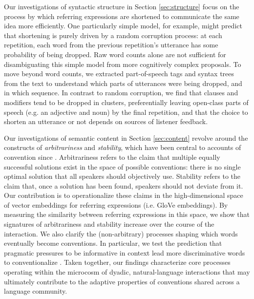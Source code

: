 \documentclass[alpha-refs]{wiley-article}
\newcommand{\ndg}[1]{\textcolor{green}{[ndg: #1]}}
\begin{document}
Our investigations of syntactic structure in Section \ref{sec:structure} focus on the process by which referring expressions are shortened to communicate the same idea more efficiently.
One particularly simple model, for example, might predict that shortening is purely driven by a random corruption process: at each repetition, each word from the previous repetition's utterance has some probability of being dropped.
Raw word counts alone are not sufficient for disambiguating this simple model from more cognitively complex proposals.
To move beyond word counts, we extracted part-of-speech tags and syntax trees from the text to understand which parts of utterances were being dropped, and in which sequence.
In contrast to random corruption, we find that clauses and modifiers tend to be dropped in clusters, preferentially leaving open-class parts of speech (e.g. an adjective and noun) by the final repetition, and that the choice to shorten an utterance or not depends on sources of listener feedback.  %

Our investigations of semantic content in Section \ref{sec:content} revolve around the constructs of \emph{arbitrariness} and \emph{stability}, which have been central to accounts of convention since \cite{Lewis69_Convention}.
Arbitrariness refers to the claim that multiple equally successful solutions exist in the space of possible conventions: there is no single optimal solution that all speakers should objectively use.
Stability refers to the claim that, once a solution has been found, speakers should not deviate from it.
Our contribution is to operationalize these claims in the high-dimensional space of vector embeddings for referring expressions (i.e. GloVe embeddings).
By measuring the similarity between referring expressions in this space, we show that signatures of arbitrariness and stability increase over the course of the interaction.
We also clarify the (non-arbitrary) processes shaping which words eventually become conventions.
In particular, we test the prediction that pragmatic pressures to be informative in context lead more discriminative words to conventionalize \citep{KirbyTamarizCornishSmith15_CompressionCommunication,GibsonEtAl17_ColorNamingUse,hawkins_emerging_abstractions_2018}. 
Taken together, our findings characterize core processes operating within the microcosm of dyadic, natural-language interactions that may ultimately contribute to the adaptive properties of conventions shared across a language community.
\end{document}
